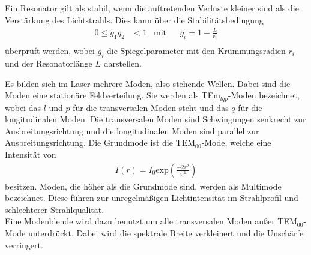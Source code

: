 Ein Resonator gilt als stabil, wenn die auftretenden Verluste kleiner sind als die Verstärkung des Lichtstrahls.
Dies kann über die Stabilitätsbedingung
\begin{align}
    0 \leq g_1 g_2 &< 1 & \text{mit}& & g_i = 1 - \frac{L}{r_i}\\
    \label{eqn:Stabilitätsbedingung}
\end{align}
überprüft werden, wobei $g_i$ die Spiegelparameter mit den Krümmungsradien $r_i$ und der Resonatorlänge $L$ darstellen.

Es bilden sich im Laser mehrere Moden, also stehende Wellen. Dabei sind die Moden eine stationäre Feldverteilung. Sie werden als TEm$_{lqp}$-Moden bezeichnet, wobei das $l$ und $p$ für die 
transversalen Moden steht und das $q$ für die longitudinalen Moden. Die transversalen Moden sind Schwingungen senkrecht zur Ausbreitungsrichtung und die longitudinalen Moden sind parallel zur 
Ausbreitungsrichtung. Die Grundmode ist die TEM$_{00}$-Mode, welche eine Intensität von 
\begin{align*}
    I(r) = I_0 \text{exp}(\frac{-2r^2}{\omega^2})
\end{align*}
besitzen. Moden, die höher als die Grundmode sind, werden als Multimode bezeichnet. Diese führen zur unregelmäßigen Lichtintensität im Strahlprofil und schlechterer Strahlqualität.\\
Eine Modenblende wird dazu benutzt um alle transversalen Moden außer TEM$_{00}$-Mode unterdrückt. Dabei wird die spektrale Breite verkleinert und die Unschärfe verringert.




